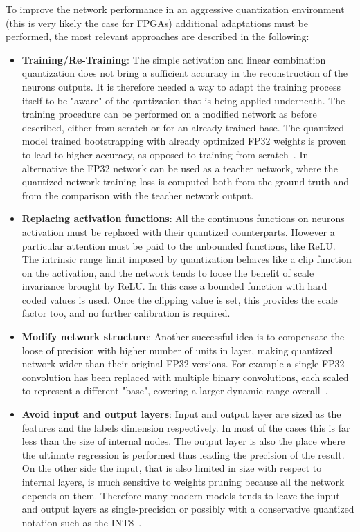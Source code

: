 To improve the network performance in an aggressive quantization environment (this is very likely the case for FPGAs) additional adaptations must be performed, the most relevant approaches are described in the following:
\begin{itemize}
    \item \textbf{Training/Re-Training}: The simple activation and linear combination quantization does not bring a sufficient accuracy in the reconstruction of the neurons outputs. It is therefore needed a way to adapt the training process itself to be "aware" of the qantization that is being applied underneath. 
    The training procedure can be performed on a modified network as before described, either from scratch or for an already trained base. The quantized model trained bootstrapping with already optimized FP32 weights is proven to lead to higher accuracy, as opposed to training from scratch~\cite{zhou2017}. 
    In alternative the FP32 network can be used as a teacher network, where the quantized network training loss is computed both from the ground-truth and from the comparison with the teacher network output.
    
    \item \textbf{Replacing activation functions}: All the continuous functions on neurons activation must be replaced with their quantized counterparts. However a particular attention must be paid to the unbounded functions, like ReLU. The intrinsic range limit imposed by quantization behaves like a clip function on the activation, and the network tends to loose the benefit of scale invariance brought by ReLU. In this case a bounded function with hard coded values is used. Once the clipping value is set, this provides the scale factor too, and no further calibration is required.
    
    \item \textbf{Modify network structure}: Another successful idea is to compensate the loose of precision with higher number of units in layer, making quantized network wider than their original FP32 versions. For example a single FP32 convolution has been replaced with multiple binary convolutions, each scaled to represent a different "base", covering a larger dynamic range overall~\cite{NIPS2017_6638}. 
    
    \item \textbf{Avoid input and output layers}: Input and output layer are sized as the features and the labels dimension respectively. In most of the cases this is far less than the size of internal nodes. The output layer is also the place where the ultimate regression is performed thus leading the precision of the result. On the other side the input, that is also limited in size with respect to internal layers, is much sensitive to weights pruning because all the network depends on them. 
    Therefore many modern models tends to leave the input and output layers as single-precision or possibly with a conservative quantized notation such as the INT8~\cite{choi2018pact}.
\end{itemize}








